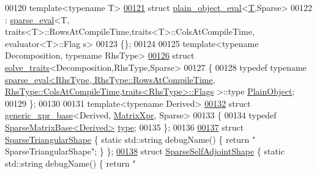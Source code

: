 \begin{DoxyCode}
00120 \textcolor{keyword}{template}<\textcolor{keyword}{typename} T>
\hyperlink{struct_eigen_1_1internal_1_1plain__object__eval_3_01_t_00_01_sparse_01_4}{00121} \textcolor{keyword}{struct }\hyperlink{struct_eigen_1_1internal_1_1plain__object__eval}{plain\_object\_eval}<\hyperlink{group___sparse_core___module}{T},Sparse>
00122   : \hyperlink{struct_eigen_1_1internal_1_1sparse__eval}{sparse\_eval}<T, traits<T>::RowsAtCompileTime,traits<T>::ColsAtCompileTime, evaluator<T>::Flag
      s>
00123 \{\};
00124 
00125 \textcolor{keyword}{template}<\textcolor{keyword}{typename} Decomposition, \textcolor{keyword}{typename} RhsType>
\hyperlink{struct_eigen_1_1internal_1_1solve__traits_3_01_decomposition_00_01_rhs_type_00_01_sparse_01_4}{00126} \textcolor{keyword}{struct }\hyperlink{struct_eigen_1_1internal_1_1solve__traits}{solve\_traits}<Decomposition,RhsType,Sparse>
00127 \{
00128   \textcolor{keyword}{typedef} \textcolor{keyword}{typename} 
      \hyperlink{struct_eigen_1_1internal_1_1sparse__eval}{sparse\_eval<RhsType, RhsType::RowsAtCompileTime, RhsType::ColsAtCompileTime,traits<RhsType>::Flags}
      >::type \hyperlink{group___sparse_core___module_class_eigen_1_1_sparse_matrix}{PlainObject};
00129 \};
00130 
00131 \textcolor{keyword}{template}<\textcolor{keyword}{typename} Derived>
\hyperlink{struct_eigen_1_1internal_1_1generic__xpr__base_3_01_derived_00_01_matrix_xpr_00_01_sparse_01_4}{00132} \textcolor{keyword}{struct }\hyperlink{struct_eigen_1_1internal_1_1generic__xpr__base}{generic\_xpr\_base}<Derived, \hyperlink{struct_eigen_1_1_matrix_xpr}{MatrixXpr}, Sparse>
00133 \{
00134   \textcolor{keyword}{typedef} \hyperlink{group___sparse_core___module_class_eigen_1_1_sparse_matrix_base}{SparseMatrixBase<Derived>} \hyperlink{group___sparse_core___module_class_eigen_1_1_sparse_matrix_base}{type};
00135 \};
00136 
\hyperlink{struct_eigen_1_1internal_1_1_sparse_triangular_shape}{00137} \textcolor{keyword}{struct }\hyperlink{struct_eigen_1_1internal_1_1_sparse_triangular_shape}{SparseTriangularShape}  \{ \textcolor{keyword}{static} std::string debugName() \{ \textcolor{keywordflow}{return} \textcolor{stringliteral}{"
      SparseTriangularShape"}; \} \};
\hyperlink{struct_eigen_1_1internal_1_1_sparse_self_adjoint_shape}{00138} \textcolor{keyword}{struct }\hyperlink{struct_eigen_1_1internal_1_1_sparse_self_adjoint_shape}{SparseSelfAdjointShape} \{ \textcolor{keyword}{static} std::string debugName() \{ \textcolor{keywordflow}{return} \textcolor{stringliteral}{"
}
\end{DoxyCode}
